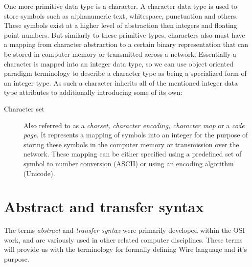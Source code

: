 \documentclass[times, utf8, diplomski]{fer}
\begin{document}
One more primitive data type is a character. A character data type is used to 
store symbols such as alphanumeric text, whitespace, punctuation and others. 
These symbols exist at a higher level of abstraction then integers and floating 
point numbers. But similarly to these primitive types, characters also must have 
a mapping from character abstraction to a certain binary representation that can 
be stored in computer memory or transmitted across a network. Essentially a 
character is mapped into an integer data type, so we can use object oriented 
paradigm terminology to describe a character type as being a specialized form of 
an integer type. As such a character inherits all of the mentioned integer data 
type attributes to additionally introducing some of its own:
\begin{description}
	\item[Character set] Also referred to as a \emph{charset, character encoding, 
		character map} or a \emph{code page}. It represents a mapping of symbols 
		into an integer for the purpose of storing these symbols in the computer 
		memory or transmission over the network. These mapping can be either 
		specified using a predefined set of symbol to number conversion (ASCII) 
		or using an encoding algorithm (Unicode).
\end{description}

\section{Abstract and transfer syntax}
The terms \emph{abstract} and \emph{transfer syntax} were primarily developed 
within the OSI work, and are variously used in other related computer disciplines. 
These terms will provide us with the terminology for formally defining Wire 
language and it's purpose.
\end{document}
